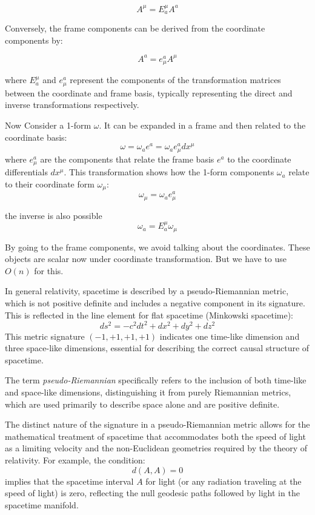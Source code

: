\documentclass{article}
\begin{document}
\[
A^\mu = E_a^\mu A^a
\]

Conversely, the frame components can be derived from the coordinate components by:

\[
A^a = e^a_\mu A^\mu
\]

where \(E_a^\mu\) and \(e^a_\mu\) represent the components of the transformation matrices between the coordinate and frame basis, typically representing the direct and inverse transformations respectively. 

Now Consider a 1-form $\omega$. It can be expanded in a frame and then related to the coordinate basis:
\[
\omega = \omega_a e^a = \omega_a e^a_\mu dx^\mu
\]
where $e^a_\mu$ are the components that relate the frame basis $e^a$ to the coordinate differentials $dx^\mu$. This transformation shows how the 1-form components $\omega_a$ relate to their coordinate form $\omega_\mu$:
\[
\omega_\mu = \omega_a e^a_\mu
\]

the inverse is also possible 
\[ \omega_a = E^\mu_a \omega_\mu  \]

By going to the frame components, we avoid talking about the coordinates. These objects are scalar now under coordinate transformation. But we have to use \( O(n) \) for this.

In general relativity, spacetime is described by a pseudo-Riemannian metric, which is not positive definite and includes a negative component in its signature. This is reflected in the line element for flat spacetime (Minkowski spacetime):
\[
ds^2 = -c^2 dt^2 + dx^2 + dy^2 + dz^2
\]
This metric signature \((-1, +1, +1, +1)\) indicates one time-like dimension and three space-like dimensions, essential for describing the correct causal structure of spacetime.

The term \textit{pseudo-Riemannian} specifically refers to the inclusion of both time-like and space-like dimensions, distinguishing it from purely Riemannian metrics, which are used primarily to describe space alone and are positive definite.

The distinct nature of the signature in a pseudo-Riemannian metric allows for the mathematical treatment of spacetime that accommodates both the speed of light as a limiting velocity and the non-Euclidean geometries required by the theory of relativity. For example, the condition:
\[
d(A, A) = 0
\]
implies that the spacetime interval \( A \) for light (or any radiation traveling at the speed of light) is zero, reflecting the null geodesic paths followed by light in the spacetime manifold.
\end{document}
